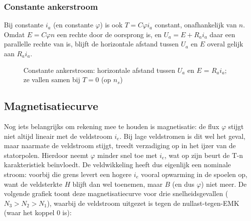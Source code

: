 \subsubsection{Constante ankerstroom}
Bij constante $i_a$ (en constante $\varphi$) is ook $T = C\varphi i_a$ constant,
onafhankelijk van $n$.
Omdat $E = C\varphi n$ een rechte door de oorsprong is, en $U_a = E + R_a i_a$ daar een
parallelle rechte van is, blijft de horizontale afstand tussen $U_a$ en $E$ overal gelijk
aan $R_a i_a$.

\begin{figure}[H]
\centering
{}
\caption{Constante ankerstroom:
horizontale afstand tussen $U_a$ en $E$ = $R_a i_a$; ze vallen samen bij $T=0$ (op $n_s$)}
\end{figure}

\subsection{Magnetisatiecurve}
Nog iets belangrijks om rekening mee te houden is magnetisatie:
de flux $\varphi$ stijgt niet altijd lineair met de veldstroom $i_e$.
Bij lage veldstromen is dit wel het geval, maar naarmate de veldstroom stijgt, treedt
verzadiging op in het ijzer van de statorpolen.
Hierdoor neemt $\varphi$ minder snel toe met $i_e$, wat op zijn beurt de T-n
karakteristiek beïnvloedt.
De veldwikkeling heeft dus eigenlijk een nominale stroom:
voorbij die grens levert een hogere $i_e$ vooral opwarming in de spoelen op, want de
veldsterkte $H$ blijft dan wel toenemen, maar $B$ (en dus $\varphi$) niet meer.
De volgende grafiek toont deze magnetisatiecurve voor drie snelheidsgevallen
($N_3 > N_2 > N_1$), waarbij de veldstroom uitgezet is tegen de nullast-tegen-EMK (waar
het koppel 0 is):

